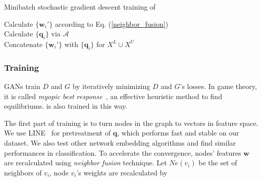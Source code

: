 \begin{algorithm}[t]
\caption{Minibatch stochastic gradient descent training of \model}\label{algo}
Calculate $\{\mathbf{w}_i'\}$ according to Eq. (\ref{neighbor_fusion}) \\
Calculate $\{\mathbf{q}_i\}$ via $\mathcal{A}$\\
Concatenate $\{\mathbf{w}_i'\}$ with $\{\mathbf{q}_i\}$ for $X^L\cup X^U$ \\
\end{algorithm}

\subsubsection{Training} GANs train $D$ and $G$ by iteratively minimizing $D$ and $G$'s losses. In game theory, it is called \emph{myopic best response}~\cite{aumann1974subjectivity}, an effective heuristic method to find equilibriums. \smodel is also trained in this way. 

The first part of training is to turn nodes in the graph to vectors in feature space. We use LINE~\cite{tang2015line} for pretreatment of $\mathbf{q}$, which performs fast and stable on our dataset. We also test other network embedding algorithms and find similar performances in classification. To accelerate the convergence, nodes' features $\mathbf{w}$ are recalculated using \textit{neighbor fusion} technique. Let $Ne(v_i)$ be the set of neighbors of $v_i$, node $v_i$'s weights are recalculated by

